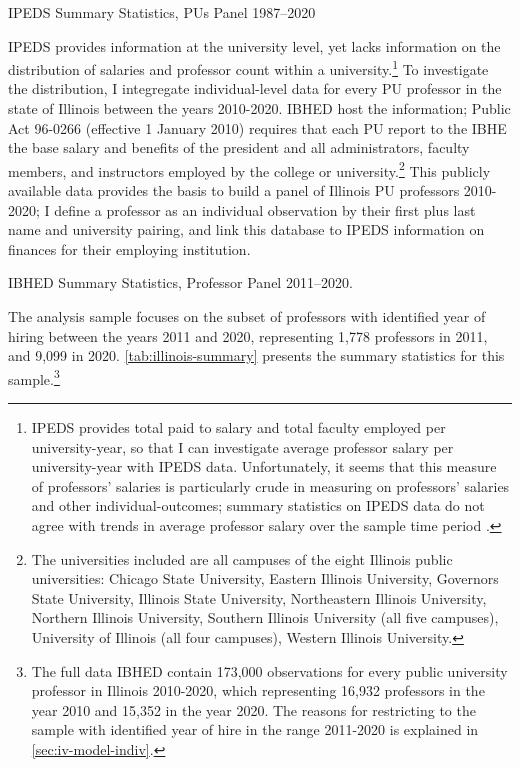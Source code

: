\documentclass[notitlepage,12pt]{article}
\begin{document}
\begin{table}[h!]
    \onehalfspacing
    \centering
    \caption{IPEDS Summary Statistics, PUs Panel 1987--2020}
    \makebox[\textwidth][c]{}
    \label{tab:ipeds-summary}
\end{table}

IPEDS provides information at the university level, yet lacks information on the distribution of salaries and professor count within a university.\footnote{
    IPEDS provides total paid to salary and total faculty employed per university-year, so that I can investigate average professor salary per university-year with IPEDS data.
    Unfortunately, it seems that this measure of professors' salaries is particularly crude in measuring on professors' salaries and other individual-outcomes; summary statistics on IPEDS data do not agree with trends in average professor salary over the sample time period \citep{aau2021survey}.
}
To investigate the distribution, I integregate individual-level data for every PU professor in the state of Illinois between the years 2010-2020.
IBHED host the information;
Public Act 96-0266 (effective 1 January 2010) requires that each PU report to the IBHE the base salary and benefits of the president and all administrators, faculty members, and instructors employed by the college or university.\footnote{
    The universities included are all campuses of the eight Illinois public universities: Chicago State University, Eastern Illinois University, Governors State University, Illinois State University, Northeastern Illinois University, Northern Illinois University, Southern Illinois University  (all five campuses), University of Illinois (all four campuses), Western Illinois University.
}
This publicly available data provides the basis to build a panel of Illinois PU professors 2010-2020; I define a professor as an individual observation by their first plus last name and university pairing, and link this database to IPEDS information on finances for their employing institution.
\begin{table}[h!]
    \onehalfspacing
    \centering
    \caption{IBHED Summary Statistics, Professor Panel 2011--2020.}
    \makebox[\textwidth][c]{}
    \label{tab:illinois-summary}
\end{table}
The analysis sample focuses on the subset of professors with identified year of hiring between the years 2011 and 2020, representing 1,778 professors in 2011, and 9,099 in 2020.
\autoref{tab:illinois-summary} presents the summary statistics for this sample.\footnote{
    The full data IBHED contain 173,000 observations for every public university professor in Illinois 2010-2020, which representing 16,932 professors in the year 2010 and 15,352 in the year 2020.
    The reasons for restricting to the sample with identified year of hire in the range 2011-2020 is explained in \autoref{sec:iv-model-indiv}.
}
\end{document}
